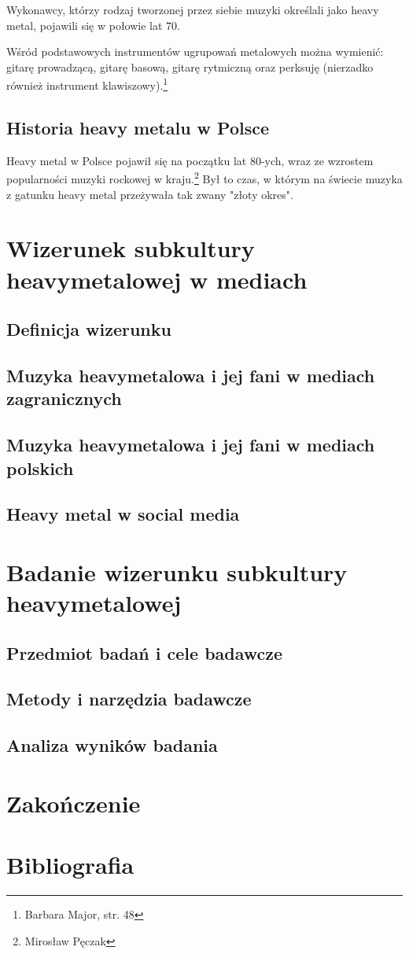 \documentclass[12pt, a4paper, titlepage]{report}
\begin{document}
Wykonawcy, którzy rodzaj tworzonej przez siebie muzyki określali jako heavy metal, pojawili się w połowie lat 70.

Wśród podstawowych instrumentów ugrupowań metalowych można wymienić: gitarę prowadzącą, gitarę basową, gitarę rytmiczną oraz perksuję (nierzadko również instrument klawiszowy).\footnote{Barbara Major, str. 48}

\section{Historia heavy metalu w Polsce}
Heavy metal w Polsce pojawił się na początku lat 80-ych, wraz ze wzrostem popularności muzyki rockowej w kraju.\footnote{Mirosław Pęczak} Był to czas, w którym na świecie muzyka z gatunku heavy metal przeżywała tak zwany "złoty okres".

\chapter{Wizerunek subkultury heavymetalowej w mediach}
\section{Definicja wizerunku}
\section{Muzyka heavymetalowa i jej fani w mediach zagranicznych}
\section{Muzyka heavymetalowa i jej fani w mediach polskich}
\section{Heavy metal w social media}
\chapter{Badanie wizerunku subkultury heavymetalowej}
\section{Przedmiot badań i cele badawcze}
\section{Metody i narzędzia badawcze}
\section{Analiza wyników badania}
\chapter*{Zakończenie}
\chapter*{Bibliografia}
\end{document}
